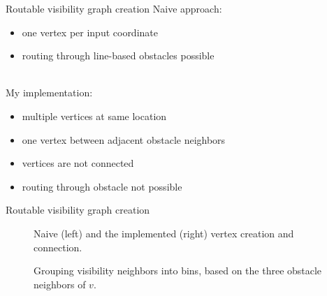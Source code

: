 \documentclass[xcolor={x11names}]{beamer}
\renewcommand{\n}{\hfill\\[0.5ex]}
\newcommand{\nn}{\hfill\\[2ex]}
\newenvironment{figcenter}
{%
	\parskip=0pt%
	\par%
	\nopagebreak%
	\centering%
}%
{%
	\par%
	\noindent%
	\ignorespacesafterend%
}
\begin{document}
		\begin{frame}{Routable visibility graph creation}
			Naive approach:\n
			\begin{itemize}
				\item one vertex per input coordinate
				\item routing through line-based obstacles possible
			\end{itemize}
			\nn
			\pause
			My implementation:\n
			\begin{itemize}
				\item multiple vertices at same location
				\item one vertex between adjacent obstacle neighbors
				\item vertices are not connected
				\item routing through obstacle not possible
			\end{itemize}
		\end{frame}
	
		\begin{frame}{Routable visibility graph creation}
			\vspace{0.35cm}
			\begin{figure}
				\begin{figcenter}
					\scalebox{0.7}
					{
						
					}
					\hspace{0.75cm}
					\scalebox{0.7}
					{
						
					}
				\end{figcenter}
				\caption{Naive (left) and the implemented (right) vertex creation and connection.}
			\end{figure}
			\vspace{-0.3cm}
			\pause
			\begin{figure}
				\begin{figcenter}
					\scalebox{0.7}
					{
						
					}
				\end{figcenter}
				\caption{Grouping visibility neighbors into bins, based on the three obstacle neighbors of $v$.}
			\end{figure}
		\end{frame}
		
\end{document}
